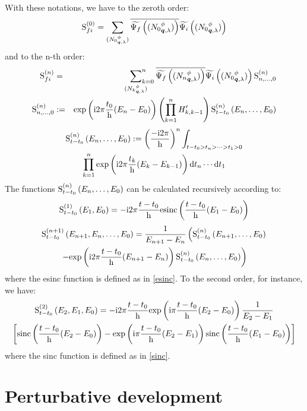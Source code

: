 \documentclass[10pt,a4paper,twoside,openany]{book}
\begin{document}
With these notations, we have to the zeroth order:
\begin{equation*}
\mathrm S_{{f}{i}}^{({0})} = \sum_{({N_0}^{\phi}_{{\boldsymbol{q}}, {\lambda}})} \overline{\widetilde{\Psi_f} \left( ({N_0}^{\phi}_{{\boldsymbol{q}}, {\lambda}}) \right) } \widetilde{\Psi_i} \left( ({N_0}^{\phi}_{{\boldsymbol{q}}, {\lambda}}) \right)
\end{equation*}
and to the n-th order:
\begin{eqnarray*}
\mathrm S_{{f}{i}}^{({n})} & = & \sideset{}{_{k=0}^n}\sum_{({N_k}^{\phi}_{{\boldsymbol{q}}, {\lambda}})} \overline{\widetilde{\Psi_f} \left( ({N_n}^{\phi}_{{\boldsymbol{q}}, {\lambda}}) \right) } \widetilde{\Psi_i} \left( ({N_0}^{\phi}_{{\boldsymbol{q}}, {\lambda}}) \right) \mathrm S^{(n)}_{n,\dotsc,0} \\
\mathrm S^{(n)}_{n,\dotsc,0} & := & \mathrm{exp} \left( {\mathrm{i} 2 \pi \frac{t_0} {\mathrm h} ( E_n - E_0 )} \right) \left( \prod_{k=1}^n H'_{k,k-1} \right) \mathrm S^{(n)}_{t - t_0}\left({E_n, \dotsc, E_0}\right)
\end{eqnarray*}
\begin{multline*}
\mathrm S^{(n)}_{t - t_0}\left({E_n, \dotsc, E_0}\right) := \left( \frac{-\mathrm{i} 2 \pi} {\mathrm h} \right)^n \int_{t - t_0 > t_n > \dotsb > t_1 > 0} \\
\prod_{k=1}^n \mathrm{exp} \left( {\mathrm{i} 2 \pi \frac{t_k} {\mathrm h} ( E_k - E_{k - 1} )} \right) \mathrm dt_n \dotsm \mathrm dt_1
\end{multline*}
The functions $\mathrm S^{(n)}_{t - t_0}\left({E_n, \dotsc, E_0}\right)$ can be calculated recursively according to:
\begin{equation*}
\mathrm S^{(1)}_{t - t_0}\left({E_1, E_0}\right) = -\mathrm{i} 2 \pi \frac{t - t_0} {\mathrm h} \mathrm{esinc} \left( {\frac{t - t_0} {\mathrm h} ( E_1 - E_0 )} \right)
\end{equation*}
\begin{multline*}
\mathrm S^{(n + 1)}_{t - t_0}\left({E_{n + 1}, E_n, \dotsc, E_0}\right) = \frac 1 {E_{n + 1} - E_n} \left( \mathrm S^{(n)}_{t - t_0}\left({E_{n + 1}, \dotsc, E_0}\right) \right. \\
\left. - \mathrm{exp} \left( {\mathrm{i} 2 \pi \frac{t - t_0} {\mathrm h} ( E_{n + 1} - E_n )} \right) \mathrm S^{(n)}_{t - t_0}\left({E_n, \dotsc, E_0}\right) \right)
\end{multline*}
where the esinc function is defined as in \ref{esinc}. To the second order, for instance, we have:
\begin{multline*}
\mathrm S^{(2)}_{t - t_0}\left({E_2, E_1, E_0}\right) = -\mathrm{i} 2 \pi \frac{t - t_0} {\mathrm h} \mathrm{exp} \left( {\mathrm{i} \pi \frac{t - t_0} {\mathrm h} ( E_2 - E_0 )} \right) \frac 1 {E_2 - E_1} \\
\left[ \mathrm{sinc} \left( {\frac{t - t_0} {\mathrm h} ( E_2 - E_0 )} \right) - \mathrm{exp} \left( {\mathrm{i} \pi \frac{t - t_0} {\mathrm h} ( E_2 - E_1 )} \right) \mathrm{sinc} \left( {\frac{t - t_0} {\mathrm h} ( E_1 - E_0 )} \right) \right]
\end{multline*}
where the sinc function is defined as in \ref{sinc}.

\section{Perturbative development}
\end{document}
